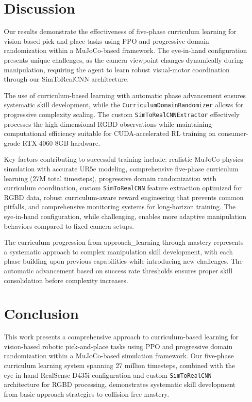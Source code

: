 \documentclass[conference]{IEEEtran}
\begin{document}
\section{Discussion}
Our results demonstrate the effectiveness of five-phase curriculum learning for vision-based pick-and-place tasks using PPO and progressive domain randomization within a MuJoCo-based framework. The eye-in-hand configuration presents unique challenges, as the camera viewpoint changes dynamically during manipulation, requiring the agent to learn robust visual-motor coordination through our SimToRealCNN architecture.

The use of curriculum-based learning with automatic phase advancement ensures systematic skill development, while the \texttt{CurriculumDomainRandomizer} allows for progressive complexity scaling. The custom \texttt{SimToRealCNNExtractor} effectively processes the high-dimensional RGBD observations while maintaining computational efficiency suitable for CUDA-accelerated RL training on consumer-grade RTX 4060 8GB hardware.

Key factors contributing to successful training include: realistic MuJoCo physics simulation with accurate UR5e modeling, comprehensive five-phase curriculum learning (27M total timesteps), progressive domain randomization with curriculum coordination, custom \texttt{SimToRealCNN} feature extraction optimized for RGBD data, robust curriculum-aware reward engineering that prevents common pitfalls, and comprehensive monitoring systems for long-horizon training. The eye-in-hand configuration, while challenging, enables more adaptive manipulation behaviors compared to fixed camera setups.

The curriculum progression from approach\_learning through mastery represents a systematic approach to complex manipulation skill development, with each phase building upon previous capabilities while introducing new challenges. The automatic advancement based on success rate thresholds ensures proper skill consolidation before complexity increases.

\section{Conclusion}
This work presents a comprehensive approach to curriculum-based learning for vision-based robotic pick-and-place tasks using PPO and progressive domain randomization within a MuJoCo-based simulation framework. Our five-phase curriculum learning system spanning 27 million timesteps, combined with the eye-in-hand RealSense D435i configuration and custom \texttt{SimToRealCNN} architecture for RGBD processing, demonstrates systematic skill development from basic approach strategies to collision-free mastery. 
\end{document}
